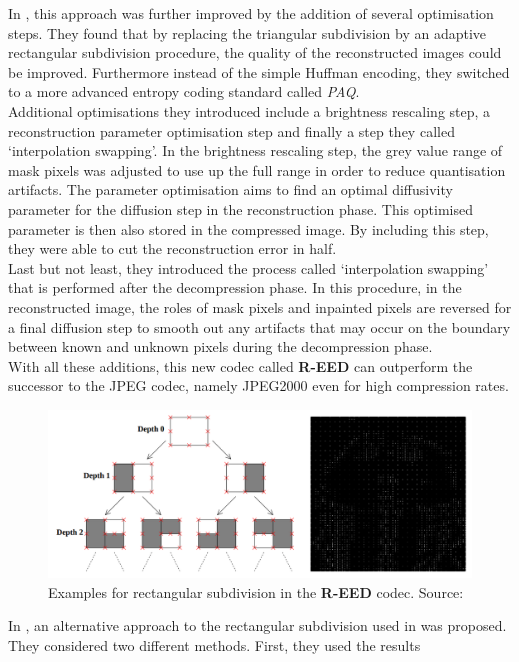 In \cite{schmaltz09}, this approach was further improved by the addition of several optimisation
steps. They found that by replacing the triangular subdivision by an adaptive rectangular
subdivision procedure, the quality of the reconstructed images could be improved. Furthermore
instead of the simple Huffman encoding, they switched to a more advanced entropy coding standard
called \textit{PAQ}\cite{paq}. \\
Additional optimisations they introduced include a brightness rescaling
step, a reconstruction parameter optimisation step and finally a step they called `interpolation
swapping'.
In the brightness rescaling step, the grey value range of mask pixels was adjusted to use up the 
full range in order to reduce quantisation artifacts.
The parameter optimisation aims to find an optimal diffusivity parameter for the diffusion step in
the reconstruction phase. This optimised parameter is then also stored in the compressed image.
By including this step, they were able to cut the reconstruction error in half.\\
Last but not least, they introduced the process called `interpolation swapping' that is performed
after the decompression phase. In this procedure, in the reconstructed image, the roles of mask
pixels and inpainted pixels are reversed for a final diffusion step to smooth out any artifacts
that may occur on the boundary between known and unknown pixels during the decompression phase.\\
With all these additions, this new codec called \textbf{R-EED} can outperform the
successor to the JPEG codec, namely JPEG2000 even for high compression rates.
\begin{figure}[ht]
    \centering
    \includegraphics[width=0.8\linewidth]{../Images/tree_trui.png}
    \caption{Examples for rectangular subdivision in the \textbf{R-EED} codec.
    Source:\cite{schmaltz09}}
\end{figure}
In \cite{hoeltgen12}, an alternative approach to the rectangular subdivision used in
\cite{schmaltz09} was proposed. They considered two different methods. First, they used the results
